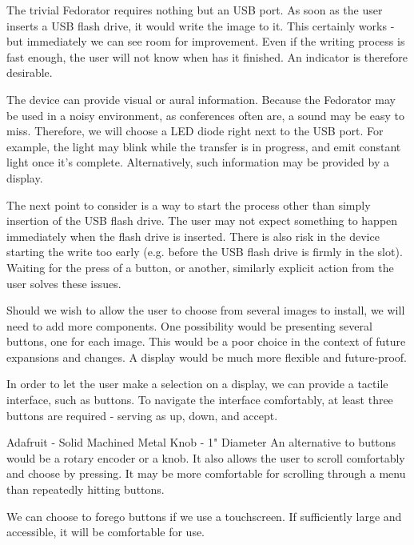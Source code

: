         The trivial Fedorator requires nothing but an USB port.  As soon as the user inserts a USB flash drive, it would write the image to it.  This certainly works - but immediately we can see room for improvement.  Even if the writing process is fast enough, the user will not know when has it finished.  An indicator is therefore desirable.
        
        The device can provide visual or aural information.  Because the Fedorator may be used in a noisy environment, as conferences often are, a sound may be easy to miss.  Therefore, we will choose a LED diode right next to the USB port.  For example, the light may blink while the transfer is in progress, and emit constant light once it's complete.  Alternatively, such information may be provided by a display.
        
        The next point to consider is a way to start the process other than simply insertion of the USB flash drive.  The user may not expect something to happen immediately when the flash drive is inserted.  There is also risk in the device starting the write too early (e.g. before the USB flash drive is firmly in the slot).  Waiting for the press of a button, or another, similarly explicit action from the user solves these issues.
        
        Should we wish to allow the user to choose from several images to install, we will need to add more components.  One possibility would be presenting several buttons, one for each image.  This would be a poor choice in the context of future expansions and changes.  A display would be much more flexible and future-proof.
        
        In order to let the user make a selection on a display, we can provide a tactile interface, such as buttons.  To navigate the interface comfortably, at least three buttons are required - serving as up, down, and accept.
        
            {Adafruit - Solid Machined Metal Knob - 1" Diameter \cite{adafruit-knob}}
        An alternative to buttons would be a rotary encoder or a knob.  It also allows the user to scroll comfortably and choose by pressing.  It may be more comfortable for scrolling through a menu than repeatedly hitting buttons.
        
        We can choose to forego buttons if we use a touchscreen.  If sufficiently large and accessible, it will be comfortable for use.
        
